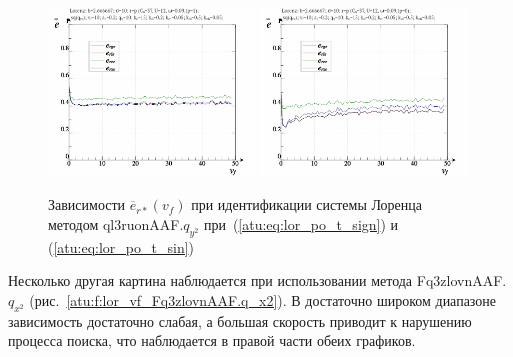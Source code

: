 \begin{figure}[ht!]
  \centerline{
    \includegraphics[width=0.49\textwidth]{p/cha/lor/ql3ruonAAF/lor_ql3ruonAAF_qy2-p_v_f_e_sign.png}
    \hfill
    \includegraphics[width=0.49\textwidth]{p/cha/lor/ql3ruonAAF/lor_ql3ruonAAF_qy2-p_v_f_e_sin.png}
  }
  \caption{Зависимости $\overline{e}_{r*}(v_f)$ при идентификации системы Лоренца методом ql3ruonAAF.$q_{y^2}$
   при~(\ref{atu:eq:lor_po_t_sign}) и (\ref{atu:eq:lor_po_t_sin})}
  \label{atu:f:lor_vf_ql3ruonAAF.q_y2}
\end{figure}

Несколько другая картина наблюдается при использовании метода  Fq3zlovnAAF.$q_{x^2}$
(рис.~\ref{atu:f:lor_vf_Fq3zlovnAAF.q_x2}).
В достаточно широком диапазоне зависимость достаточно слабая,
а большая скорость приводит к нарушению процесса поиска,
что наблюдается в правой части обеих графиков.

